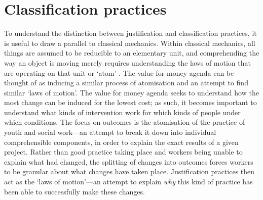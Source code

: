 \section{Classification practices}
\label{sec:6-6-classification-practices}
To understand the distinction between justification and classification practices, it is useful to draw a parallel to classical mechanics. Within classical mechanics, all things are assumed to be reducible to an elementary unit, and comprehending the way an object is moving merely requires understanding the laws of motion that are operating on that unit or `atom' \citep{capra_web_1996}. The value for money agenda can be thought of as inducing a similar process of atomisation and an attempt to find similar `laws of motion'. The value for money agenda seeks to understand how the most change can be induced for the lowest cost; as such, it becomes important to understand what kinds of intervention work for which kinds of people under which conditions. The focus on outcomes is the atomisation of the practice of youth and social work—an attempt to break it down into individual comprehensible components, in order to explain the exact results of a given project. Rather than good practice taking place and workers being unable to explain what had changed, the splitting of changes into outcomes forces workers to be granular about what changes have taken place. Justification practices then act as the `laws of motion'—an attempt to explain \emph{why} this kind of practice has been able to successfully make these changes. 

